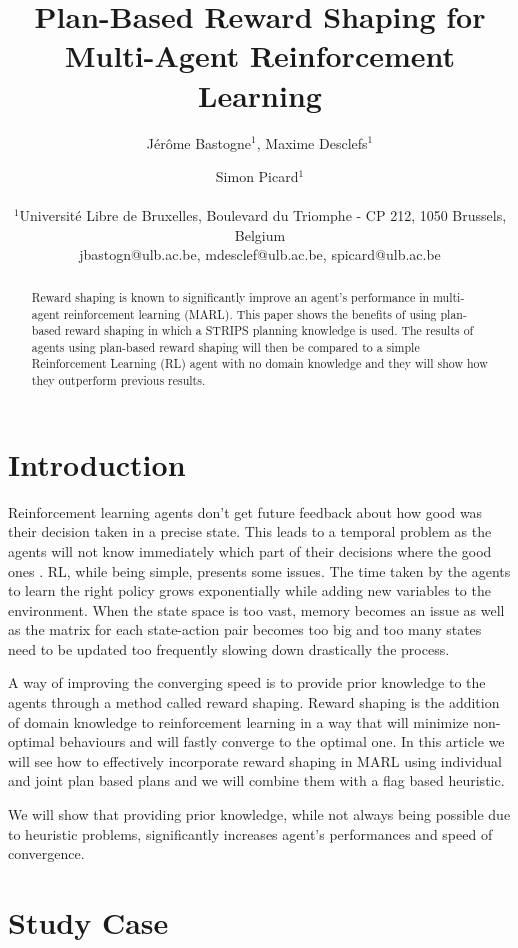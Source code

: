 \documentclass[letterpaper]{article}
\title{Plan-Based Reward Shaping for Multi-Agent Reinforcement Learning}
\author{Jérôme Bastogne$^{1}$, Maxime Desclefs$^{1}$ \and Simon Picard$^{1}$ \\
\mbox{}\\
$^1$Université Libre de Bruxelles, Boulevard du Triomphe - CP 212, 1050 Brussels, Belgium \\
jbastogn@ulb.ac.be, mdesclef@ulb.ac.be, spicard@ulb.ac.be}
\begin{document}
\maketitle

\begin{abstract}
Reward shaping is known to significantly improve an agent’s performance in multi-agent reinforcement
learning (MARL). This paper shows the benefits of using plan-based reward shaping in which a STRIPS planning knowledge is used. The results of agents using plan-based reward shaping will then be compared to a simple Reinforcement Learning (RL) agent with no domain knowledge and they will show how they outperform previous results.
\end{abstract}

\section{Introduction}

Reinforcement learning agents don't get future feedback about how good was their decision taken in a precise state. This leads to a temporal problem as the agents will not know immediately which part of their decisions where the good ones \citep{rs}. RL, while being simple, presents some issues. The time taken by the agents to learn the right policy grows exponentially while adding new variables to the environment. When the state space is too vast, memory becomes an issue as well as the matrix for each state-action pair becomes too big and too many states need to be updated too frequently slowing down drastically the process. 

A way of improving the converging speed is to provide prior knowledge to the agents through a method called reward shaping. Reward shaping is the addition of domain knowledge to reinforcement learning in a way that will minimize non-optimal behaviours and will fastly converge to the optimal one. In this article we will see how to effectively incorporate reward shaping in MARL using individual and joint plan based plans and we will combine them with a flag based heuristic\citep{paper4}.

We will show that providing prior knowledge, while not always being possible due to heuristic problems, significantly increases agent's performances and speed of convergence.

\section{Study Case}
\end{document}

